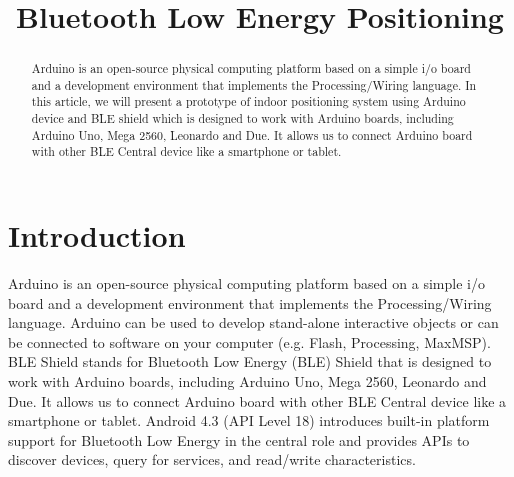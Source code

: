 \documentclass[conference,a4paper]{../../sty/IEEEtran}
\begin{document}
%
\title{Bluetooth Low Energy Positioning}


\author{
}


\maketitle


\begin{abstract}

Arduino is an open-source physical computing platform based on a simple i/o board and a development environment that implements the Processing/Wiring language. In this article, we will present a prototype of indoor positioning system using Arduino device and BLE shield which is designed to work with Arduino boards, including Arduino Uno, Mega 2560, Leonardo and Due. It allows us to connect Arduino board with other BLE Central device like a smartphone or tablet. 

\end{abstract}




\section{Introduction}
Arduino is an open-source physical computing platform based on a simple i/o board and a development environment that implements the Processing/Wiring language. Arduino can be used to develop stand-alone interactive objects or can be connected to software on your computer (e.g. Flash, Processing, MaxMSP). BLE Shield stands for Bluetooth Low Energy (BLE) Shield \cite{ble} that is designed to work with Arduino boards, including Arduino Uno, Mega 2560, Leonardo and Due. It allows us to connect Arduino board with other BLE Central device like a smartphone or tablet. Android 4.3 (API Level 18) introduces built-in platform support for Bluetooth Low Energy in the central role and provides APIs to discover devices, query for services, and read/write characteristics.
\end{document}

